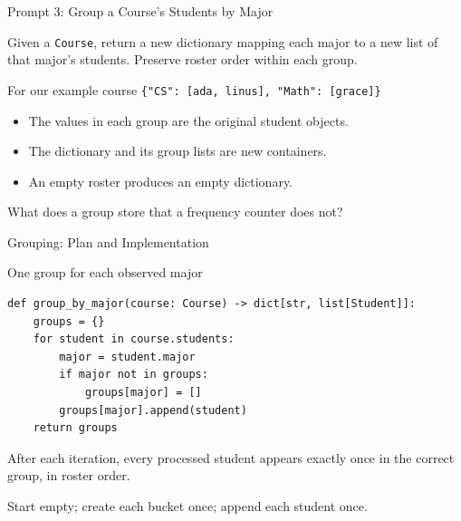 \documentclass[aspectratio=169,10pt]{beamer}
\begin{document}
\begin{frame}{Prompt 3: Group a Course's Students by Major}
\small
\begin{activity}
Given a \texttt{Course}, return a new dictionary mapping each major to a new list of that major's students. Preserve roster order within each group.
\end{activity}
\begin{block}{For our example course}
\texttt{\{"CS": [ada, linus], "Math": [grace]\}}
\end{block}
\begin{itemize}
 \item The values in each group are the original student objects.
 \item The dictionary and its group lists are new containers.
 \item An empty roster produces an empty dictionary.
\end{itemize}
\begin{activity}What does a group store that a frequency counter does not?\end{activity}
\end{frame}

\begin{frame}[fragile]{Grouping: Plan and Implementation}
\small
\begin{block}{One group for each observed major}
\footnotesize
\begin{verbatim}
def group_by_major(course: Course) -> dict[str, list[Student]]:
    groups = {}
    for student in course.students:
        major = student.major
        if major not in groups:
            groups[major] = []
        groups[major].append(student)
    return groups
\end{verbatim}
\end{block}
\begin{keyidea}After each iteration, every processed student appears exactly once in the correct group, in roster order.\end{keyidea}
Start empty; create each bucket once; append each student once.
\end{frame}
\end{document}
